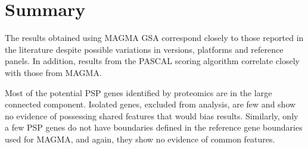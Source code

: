  
 

 
 
 

  


\clearpage


\section{Summary}
\label{sec:Methods Discussion}

The results obtained using MAGMA GSA correspond closely to those reported in the literature despite possible variations in versions, platforms and reference panels. In addition, results from the PASCAL scoring algorithm correlate closely with those from MAGMA. 

Most of the potential PSP genes identified by proteomics are in the large connected component. Isolated genes,  excluded from analysis, are few and show no evidence of possessing shared features that would bias results. Similarly, only a few PSP genes do not have boundaries defined in the reference gene boundaries used for MAGMA, and again, they show no evidence of common features. 

